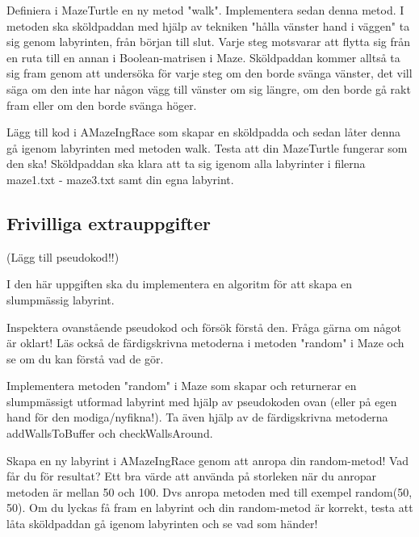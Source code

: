 \Subtask Definiera i MazeTurtle en ny metod "walk". Implementera sedan denna metod. I metoden ska sköldpaddan med hjälp av tekniken "hålla vänster hand i väggen" ta sig genom labyrinten, från början till slut. Varje steg motsvarar att flytta sig från en ruta till en annan i Boolean-matrisen i Maze. Sköldpaddan kommer alltså ta sig fram genom att undersöka för varje steg om den borde svänga vänster, det vill säga om den inte har någon vägg till vänster om sig längre, om den borde gå rakt fram eller om den borde svänga höger.

\Subtask Lägg till kod i AMazeIngRace som skapar en sköldpadda och sedan låter denna gå igenom labyrinten med metoden walk. Testa att din MazeTurtle fungerar som den ska! Sköldpaddan ska klara att ta sig igenom alla labyrinter i filerna maze1.txt - maze3.txt samt din egna labyrint.

\subsection{Frivilliga extrauppgifter}

(Lägg till pseudokod!!)

\Task I den här uppgiften ska du implementera en algoritm för att skapa en slumpmässig labyrint.

\Subtask Inspektera ovanstående pseudokod och försök förstå den. Fråga gärna om något är oklart! Läs också de färdigskrivna metoderna i metoden "random" i Maze och se om du kan förstå vad de gör.

\Subtask Implementera metoden "random" i Maze som skapar och returnerar en slumpmässigt utformad labyrint med hjälp av pseudokoden ovan (eller på egen hand för den modiga/nyfikna!). Ta även hjälp av de färdigskrivna metoderna addWallsToBuffer och checkWallsAround.

\Subtask Skapa en ny labyrint i AMazeIngRace genom att anropa din random-metod! Vad får du för resultat? Ett bra värde att använda på storleken när du anropar metoden är mellan 50 och 100. Dvs anropa metoden med till exempel random(50, 50). Om du lyckas få fram en labyrint och din random-metod är korrekt, testa att låta sköldpaddan gå igenom labyrinten och se vad som händer!
    
